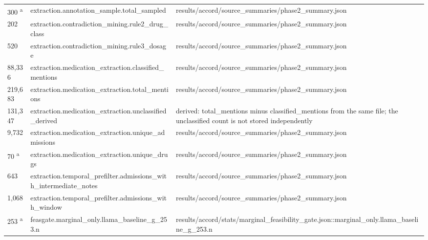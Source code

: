 \begin{longtable}{@{}p{0.7in}p{1.9in}p{2.6in}@{}}
300 \textsuperscript{a} & extraction.\allowbreak{}annotation\_sample.\allowbreak{}total\_sampled & results/\allowbreak{}accord/\allowbreak{}source\_summaries/\allowbreak{}phase2\_summary.\allowbreak{}json\\
202 & extraction.\allowbreak{}contradiction\_mining.\allowbreak{}rule2\_drug\_class & results/\allowbreak{}accord/\allowbreak{}source\_summaries/\allowbreak{}phase2\_summary.\allowbreak{}json\\
520 & extraction.\allowbreak{}contradiction\_mining.\allowbreak{}rule3\_dosage & results/\allowbreak{}accord/\allowbreak{}source\_summaries/\allowbreak{}phase2\_summary.\allowbreak{}json\\
88,336 & extraction.\allowbreak{}medication\_extraction.\allowbreak{}classified\_mentions & results/\allowbreak{}accord/\allowbreak{}source\_summaries/\allowbreak{}phase2\_summary.\allowbreak{}json\\
219,683 & extraction.\allowbreak{}medication\_extraction.\allowbreak{}total\_mentions & results/\allowbreak{}accord/\allowbreak{}source\_summaries/\allowbreak{}phase2\_summary.\allowbreak{}json\\
131,347 & extraction.\allowbreak{}medication\_extraction.\allowbreak{}unclassified\_derived & derived: total\_mentions minus classified\_mentions from the same file; the unclassified count is not stored independently\\
9,732 & extraction.\allowbreak{}medication\_extraction.\allowbreak{}unique\_admissions & results/\allowbreak{}accord/\allowbreak{}source\_summaries/\allowbreak{}phase2\_summary.\allowbreak{}json\\
70 \textsuperscript{a} & extraction.\allowbreak{}medication\_extraction.\allowbreak{}unique\_drugs & results/\allowbreak{}accord/\allowbreak{}source\_summaries/\allowbreak{}phase2\_summary.\allowbreak{}json\\
643 & extraction.\allowbreak{}temporal\_prefilter.\allowbreak{}admissions\_with\_intermediate\_notes & results/\allowbreak{}accord/\allowbreak{}source\_summaries/\allowbreak{}phase2\_summary.\allowbreak{}json\\
1,068 & extraction.\allowbreak{}temporal\_prefilter.\allowbreak{}admissions\_with\_window & results/\allowbreak{}accord/\allowbreak{}source\_summaries/\allowbreak{}phase2\_summary.\allowbreak{}json\\
253 \textsuperscript{a} & feasgate.\allowbreak{}marginal\_only.\allowbreak{}llama\_baseline\_g\_253.\allowbreak{}n & results/\allowbreak{}accord/\allowbreak{}stats/\allowbreak{}marginal\_feasibility\_gate.\allowbreak{}json::marginal\_only.\allowbreak{}llama\_baseline\_g\_253.\allowbreak{}n\\

\end{longtable}
